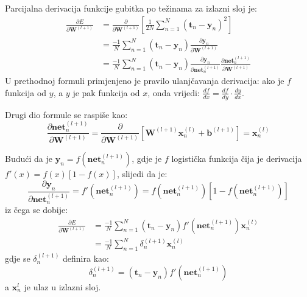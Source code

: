 \documentclass[times, utf8, diplomski, numeric]{fer}
\begin{document}
Parcijalna derivacija funkcije gubitka po težinama za izlazni sloj je:
\begin{equation} %
\begin{split}
  \frac{\partial E}{\partial \boldsymbol{W}^{(l+1)}}
    &= \frac{\partial}{\partial \boldsymbol{W}^{(l+1)}} \left[ \frac{1}{2N} \sum_{n=1}^{N} \left( \boldsymbol{t}_{n} - \boldsymbol{y}_{n} \right)^2 \right] \\
    &= \frac{-1}{N} \sum_{n=1}^{N} \left( \boldsymbol{t}_{n} - \boldsymbol{y}_{n} \right) \frac{\partial \boldsymbol{y}_n}{\partial \boldsymbol{W}^{(l+1)}} \\
    &= \frac{-1}{N} \sum_{n=1}^{N} \left( \boldsymbol{t}_{n} - \boldsymbol{y}_{n} \right) \frac{\partial \boldsymbol{y}_n}{\partial \boldsymbol{net}_n^{(l+1)}} \frac{\partial \boldsymbol{net}_n^{(l+1)}}{\partial \boldsymbol{W}^{(l+1)}}
\end{split}
\end{equation}
U prethodnoj formuli primjenjeno je pravilo ulanjčavanja derivacija: ako je $f$ funkcija od $y$, a $y$ je pak funkcija od $x$, onda vrijedi: $\frac{d f}{d x} = \frac{d f}{d y} \cdot \frac{d y}{d x}$.

Drugi dio formule se raspiše kao:
\begin{equation}  %
\label{eq:parc_net_over_parc_w}
  \frac{\partial \boldsymbol{net}_n^{(l+1)}}{\partial \boldsymbol{W}^{(l+1)}}
    = \frac{\partial}{\partial \boldsymbol{W}^{(l+1)}} \left[ \boldsymbol{W}^{(l+1)} \boldsymbol{x}_n^{(l)} + \boldsymbol{b}^{(l+1)} \right]
    = \boldsymbol{x}_n^{(l)}
\end{equation}

Budući da je $\boldsymbol{y}_n = f(\boldsymbol{net}_n^{(l+1)} )$, gdje je $f$ logistička funkcija čija je derivacija $f'(x) = f(x) [1 - f(x) ]$, slijedi da je:
\begin{equation} %
  \frac{\partial \boldsymbol{y}_n}{\partial \boldsymbol{net}_n^{(l+1)}}
    = f'\left(\boldsymbol{net}_n^{(l+1)}\right)
    = f\left(\boldsymbol{net}_n^{(l+1)}\right) \left[ 1 - f\left(\boldsymbol{net}_n^{(l+1)}\right) \right]
\end{equation}
iz čega se dobije:
\begin{equation}
\begin{split}
  \frac{\partial E}{\partial \boldsymbol{W}^{(l+1)}}
    &= \frac{-1}{N} \sum_{n=1}^{N} \left( \boldsymbol{t}_{n} - \boldsymbol{y}_{n} \right) f'\left(\boldsymbol{net}_n^{(l+1)}\right) \boldsymbol{x}_n^{(l)} \\
    &= \frac{-1}{N} \sum_{n=1}^{N} \delta_n^{(l+1)} \boldsymbol{x}_n^{(l)}
\end{split}
\end{equation} %
gdje se $\delta_n^{(l+1)}$ definira kao:
\begin{equation} 
\label{eq:delta_lastlayer}
  \delta_n^{(l+1)}
    = \left( \boldsymbol{t}_{n} - \boldsymbol{y}_{n} \right) f'\left(\boldsymbol{net}_n^{(l+1)}\right)
\end{equation}
a $\boldsymbol{x}_n^{l}$ je ulaz u izlazni sloj.
\end{document}
